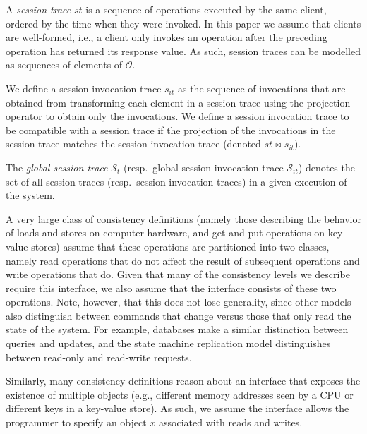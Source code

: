 \documentclass[journal,compsoc]{IEEEtran}
\begin{document}
A \emph{session trace} $\mathit{st}$ is a sequence of operations executed by the same client, ordered by the time when they were invoked. In this paper we assume that clients are well-formed, i.e., a client only invokes an operation after the preceding operation has returned its response value. As such, session traces can be modelled as sequences of elements of $\mathcal{O}$.

We define a session invocation trace $\mathit{s}_{it}$ as the sequence of invocations that are obtained from transforming each element in a session trace using the projection operator to obtain only the invocations. We define a session invocation trace to be compatible with a session trace if the projection of the invocations in the session trace matches the session invocation trace (denoted $st\bowtie s_{it}$).

The \emph{global session trace} $\mathcal{S}_t$ (resp.\ global session invocation trace $\mathcal{S}_{it}$) denotes the set of all
   session traces (resp.\ session invocation traces) in a given execution of the system.

A very large class of consistency definitions (namely those describing the behavior of loads and stores on computer hardware, and get and put operations on key-value stores) assume that these operations are partitioned into two classes, namely read operations that do not affect the result of subsequent operations and write operations that do. Given that many of the consistency levels we describe require this interface, we  also assume that the interface consists of these two operations. Note, however, that this does not lose generality, since other models also distinguish between commands that change versus those that only read the state of the system. For example, databases make a similar distinction between queries and updates, and the state machine replication model distinguishes between read-only and read-write requests.

Similarly, many consistency definitions reason about an interface that exposes the existence of multiple objects (e.g., different memory addresses seen by a CPU or different keys in a key-value store). As such, we assume the interface allows the programmer to specify an object $x$ associated with reads and writes.

\end{document}

